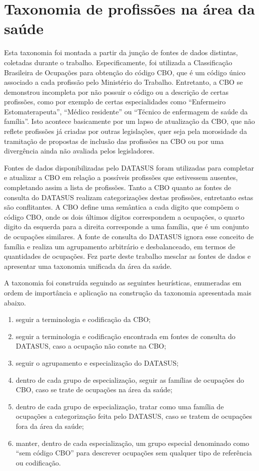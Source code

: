\documentclass[a4paper,11pt]{article}
\begin{document}
\section{Taxonomia de profissões na área da saúde}
\label{app:taxonomiaProfissoes}

Esta taxonomia foi montada a partir da junção de fontes de dados distintas, coletadas durante o trabalho.
Especificamente, foi utilizada a Classificação Brasileira de Ocupações para obtenção do código CBO, que é um código único associado a cada profissão pelo Ministério do Trabalho.
Entretanto, a CBO se demonstrou incompleta por não possuir o código ou a descrição de certas profissões, como por exemplo de certas especialidades como ``Enfermeiro Estomaterapeuta'', ``Médico residente'' ou ``Técnico de enfermagem de saúde da família''.
Isto acontece basicamente por um lapso de atualização da CBO, que não reflete profissões já criadas por outras legislações, quer seja pela morosidade da tramitação de propostas de inclusão das profissões na CBO ou por uma divergência ainda não avaliada pelos legisladores.

Fontes de dados disponibilizadas pelo DATASUS foram utilizadas para completar e atualizar a CBO em relação a possíveis profissões que estivessem ausentes, completando assim a lista de profissões.
Tanto a CBO quanto as fontes de consulta do DATASUS realizam categorizações destas profissões, entretanto estas são conflitantes.
A CBO define uma semântica a cada digito que compõem o código CBO, onde os dois últimos dígitos correspondem a ocupações, o quarto digito da esquerda para a direita corresponde a uma família, que é um conjunto de ocupações similares.
A fonte de consulta do DATASUS ignora esse conceito de família e realiza um agrupamento arbitrário e desbalanceado, em termos de quantidades de ocupações.
Fez parte deste trabalho mesclar as fontes de dados e apresentar uma taxonomia unificada da área da saúde.

A taxonomia foi construída seguindo as seguintes heurísticas, enumeradas em ordem de importância e aplicação na construção da taxonomia apresentada mais abaixo.

\begin{enumerate}
  \item seguir a terminologia e codificação da CBO;
  \item seguir a terminologia e codificação encontrada em fontes de consulta do DATASUS, caso a ocupação não conste na CBO;
  \item seguir o agrupamento e especialização do DATASUS;
  \item dentro de cada grupo de especialização, seguir as famílias de ocupações do CBO, caso se trate de ocupações na área da saúde;
  \item dentro de cada grupo de especialização, tratar como uma família de ocupações a categorização feita pelo DATASUS, caso se tratem de ocupações fora da área da saúde;
  \item manter, dentro de cada especialização, um grupo especial denominado como ``sem código CBO'' para descrever ocupações sem qualquer tipo de referência ou codificação.
\end{enumerate}
\end{document}
